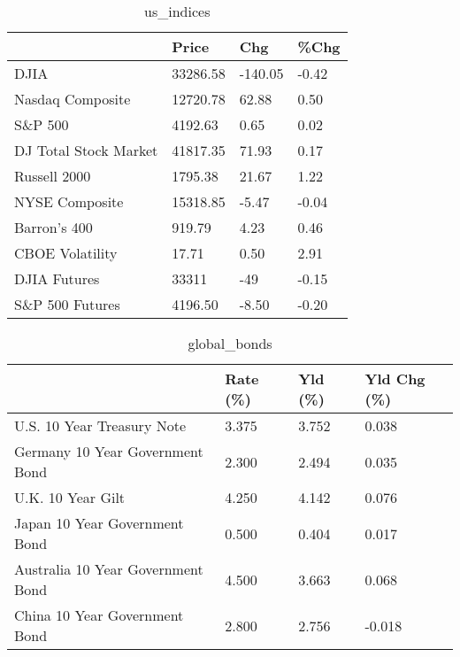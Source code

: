 \documentclass{article}%
\begin{document}
%


\begin{table}[htbp]%
\caption{us\_indices}%
\centering%
\begin{adjustbox}{width=1\textwidth}%
\begin{tabular}{llll}
\toprule
                      &    Price &     Chg &  \%Chg \\
\midrule
                 DJIA & 33286.58 & -140.05 & -0.42 \\
     Nasdaq Composite & 12720.78 &   62.88 &  0.50 \\
              S\&P 500 &  4192.63 &    0.65 &  0.02 \\
DJ Total Stock Market & 41817.35 &   71.93 &  0.17 \\
         Russell 2000 &  1795.38 &   21.67 &  1.22 \\
       NYSE Composite & 15318.85 &   -5.47 & -0.04 \\
         Barron's 400 &   919.79 &    4.23 &  0.46 \\
      CBOE Volatility &    17.71 &    0.50 &  2.91 \\
         DJIA Futures &    33311 &     -49 & -0.15 \\
      S\&P 500 Futures &  4196.50 &   -8.50 & -0.20 \\
\bottomrule
\end{tabular}
%
\end{adjustbox}%
\end{table}

%


\begin{table}[htbp]%
\caption{global\_bonds}%
\centering%
\begin{adjustbox}{width=1\textwidth}%
\begin{tabular}{llll}
\toprule
                                  & Rate (\%) & Yld (\%) & Yld Chg (\%) \\
\midrule
       U.S. 10 Year Treasury Note &    3.375 &   3.752 &       0.038 \\
  Germany 10 Year Government Bond &    2.300 &   2.494 &       0.035 \\
                U.K. 10 Year Gilt &    4.250 &   4.142 &       0.076 \\
    Japan 10 Year Government Bond &    0.500 &   0.404 &       0.017 \\
Australia 10 Year Government Bond &    4.500 &   3.663 &       0.068 \\
    China 10 Year Government Bond &    2.800 &   2.756 &      -0.018 \\
\bottomrule
\end{tabular}
%
\end{adjustbox}%
\end{table}
\end{document}
